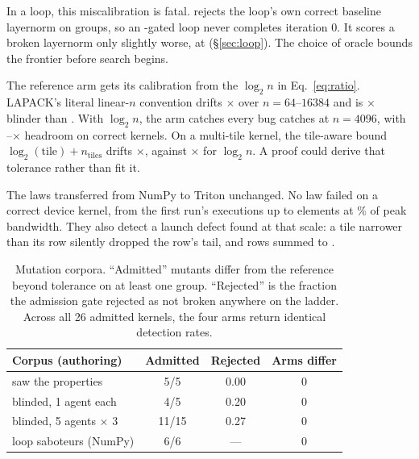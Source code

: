 In a loop, this miscalibration is fatal. \allclose rejects the loop's own correct
baseline layernorm on \fpAllcloseLN{} groups, so an \allclose-gated loop never completes
iteration 0. It scores a broken layernorm only slightly worse, at \lnBrokenAllclose{}
(\S\ref{sec:loop}). The choice of oracle bounds the frontier before search begins.

The reference arm gets its calibration from the $\log_2 n$ in Eq.~\eqref{eq:ratio}.
LAPACK's literal linear-$n$ convention drifts \linearNDrift$\times$ over
$n = 64$--$16384$ and is \linearNBlinder$\times$ blinder than \allclose. With $\log_2 n$,
the arm catches every bug \allclose catches at $n = 4096$, with
\logHeadroomLo--\logHeadroomHi$\times$ headroom on correct kernels. On a multi-tile
kernel, the tile-aware bound $\log_2(\text{tile}) + n_\text{tiles}$ drifts
\multiTileTileAwareDrift$\times$, against \multiTileLogDrift$\times$ for $\log_2 n$. A
proof could derive that tolerance rather than fit it.

The laws transferred from NumPy to Triton unchanged. No law failed on a correct device
kernel, from the first run's \firstRunRows{} executions up to \scaleElements{} elements at
\scaleRoofline\% of peak bandwidth. They also detect a launch defect found at that scale:
a tile narrower than its row silently dropped the row's tail, and rows summed to
\tileTailRowSum.

\begin{table}[t]
\centering
\small
\setlength{\tabcolsep}{4pt}
\begin{tabular}{@{}lccc@{}}
\toprule
Corpus (authoring) & Admitted & Rejected & Arms differ \\
\midrule
saw the properties          & 5/5   & 0.00 & 0 \\
blinded, 1 agent each       & 4/5   & 0.20 & 0 \\
blinded, 5 agents $\times$ 3 & 11/15 & 0.27 & 0 \\
loop saboteurs (NumPy)      & 6/6   & ---  & 0 \\
\bottomrule
\end{tabular}
\caption{Mutation corpora. ``Admitted'' mutants differ from the reference beyond
  tolerance on at least one group. ``Rejected'' is the fraction the admission gate rejected
  as not broken anywhere on the ladder. Across all 26 admitted kernels, the four arms
  return identical detection rates.}
\label{tab:corpora}
\end{table}

